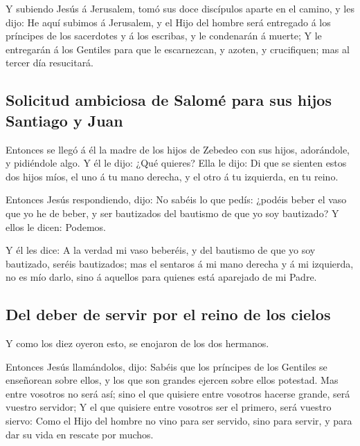  Y subiendo Jesús á Jerusalem, tomó sus doce discípulos
aparte en el camino, y les dijo:  He aquí subimos á
Jerusalem, y el Hijo del hombre será entregado á los príncipes de los
sacerdotes y á los escribas, y le condenarán á muerte;  Y
le entregarán á los Gentiles para que le escarnezcan, y azoten, y
crucifiquen; mas al tercer día resucitará.

\hypertarget{solicitud-ambiciosa-de-salomuxe9-para-sus-hijos-santiago-y-juan}{%
\subsection{Solicitud ambiciosa de Salomé para sus hijos Santiago y
Juan}\label{solicitud-ambiciosa-de-salomuxe9-para-sus-hijos-santiago-y-juan}}

 Entonces se llegó á él la madre de los hijos de Zebedeo
con sus hijos, adorándole, y pidiéndole algo.  Y él le
dijo: ¿Qué quieres? Ella le dijo: Di que se sienten estos dos hijos
míos, el uno á tu mano derecha, y el otro á tu izquierda, en tu reino.

 Entonces Jesús respondiendo, dijo: No sabéis lo que pedís:
¿podéis beber el vaso que yo he de beber, y ser bautizados del bautismo
de que yo soy bautizado? Y ellos le dicen: Podemos.

 Y él les dice: A la verdad mi vaso beberéis, y del
bautismo de que yo soy bautizado, seréis bautizados; mas el sentaros á
mi mano derecha y á mi izquierda, no es mío darlo, sino á aquellos para
quienes está aparejado de mi Padre.

\hypertarget{del-deber-de-servir-por-el-reino-de-los-cielos}{%
\subsection{Del deber de servir por el reino de los
cielos}\label{del-deber-de-servir-por-el-reino-de-los-cielos}}

 Y como los diez oyeron esto, se enojaron de los dos
hermanos.

 Entonces Jesús llamándolos, dijo: Sabéis que los príncipes
de los Gentiles se enseñorean sobre ellos, y los que son grandes ejercen
sobre ellos potestad.  Mas entre vosotros no será así; sino
el que quisiere entre vosotros hacerse grande, será vuestro servidor;
 Y el que quisiere entre vosotros ser el primero, será
vuestro siervo:  Como el Hijo del hombre no vino para ser
servido, sino para servir, y para dar su vida en rescate por muchos.

